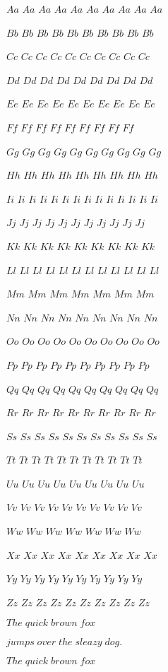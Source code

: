 \documentclass{worksheet}
\begin{document}
\begin{drillsheet}
\small

$Aa$ $Aa$ $Aa$ $Aa$ $Aa$ $Aa$ $Aa$ $Aa$ $Aa$ $Aa$

$Bb$ $Bb$ $Bb$ $Bb$ $Bb$ $Bb$ $Bb$ $Bb$ $Bb$ $Bb$

$Cc$ $Cc$ $Cc$ $Cc$ $Cc$ $Cc$ $Cc$ $Cc$ $Cc$ $Cc$

$Dd$ $Dd$ $Dd$ $Dd$ $Dd$ $Dd$ $Dd$ $Dd$ $Dd$

$Ee$ $Ee$ $Ee$ $Ee$ $Ee$ $Ee$ $Ee$ $Ee$ $Ee$ $Ee$

$Ff$ $Ff$ $Ff$ $Ff$ $Ff$ $Ff$ $Ff$ $Ff$ $Ff$

$Gg$ $Gg$ $Gg$ $Gg$ $Gg$ $Gg$ $Gg$ $Gg$ $Gg$ $Gg$

$Hh$ $Hh$ $Hh$ $Hh$ $Hh$ $Hh$ $Hh$ $Hh$ $Hh$

$Ii$ $Ii$ $Ii$ $Ii$ $Ii$ $Ii$ $Ii$ $Ii$ $Ii$ $Ii$ $Ii$ $Ii$ $Ii$ $Ii$

$Jj$ $Jj$ $Jj$ $Jj$ $Jj$ $Jj$ $Jj$ $Jj$ $Jj$ $Jj$ $Jj$

$Kk$ $Kk$ $Kk$ $Kk$ $Kk$ $Kk$ $Kk$ $Kk$ $Kk$

$Ll$ $Ll$ $Ll$ $Ll$ $Ll$ $Ll$ $Ll$ $Ll$ $Ll$ $Ll$ $Ll$ $Ll$

$Mm$ $Mm$ $Mm$ $Mm$ $Mm$ $Mm$ $Mm$

$Nn$ $Nn$ $Nn$ $Nn$ $Nn$ $Nn$ $Nn$ $Nn$ $Nn$

$Oo$ $Oo$ $Oo$ $Oo$ $Oo$ $Oo$ $Oo$ $Oo$ $Oo$ $Oo$

$Pp$ $Pp$ $Pp$ $Pp$ $Pp$ $Pp$ $Pp$ $Pp$ $Pp$ $Pp$

$Qq$ $Qq$ $Qq$ $Qq$ $Qq$ $Qq$ $Qq$ $Qq$ $Qq$ $Qq$

$Rr$ $Rr$ $Rr$ $Rr$ $Rr$ $Rr$ $Rr$ $Rr$ $Rr$ $Rr$

$Ss$ $Ss$ $Ss$ $Ss$ $Ss$ $Ss$ $Ss$ $Ss$ $Ss$ $Ss$ $Ss$

$Tt$ $Tt$ $Tt$ $Tt$ $Tt$ $Tt$ $Tt$ $Tt$ $Tt$ $Tt$ $Tt$

$Uu$ $Uu$ $Uu$ $Uu$ $Uu$ $Uu$ $Uu$ $Uu$ $Uu$

$Vv$ $Vv$ $Vv$ $Vv$ $Vv$ $Vv$ $Vv$ $Vv$ $Vv$ $Vv$

$Ww$ $Ww$ $Ww$ $Ww$ $Ww$ $Ww$ $Ww$

$Xx$ $Xx$ $Xx$ $Xx$ $Xx$ $Xx$ $Xx$ $Xx$ $Xx$

$Yy$ $Yy$ $Yy$ $Yy$ $Yy$ $Yy$ $Yy$ $Yy$ $Yy$ $Yy$

$Zz$ $Zz$ $Zz$ $Zz$ $Zz$ $Zz$ $Zz$ $Zz$ $Zz$ $Zz$

$The\;quick\;brown\;fox$

$jumps\;over\;the\;sleazy\;dog.$

$The\;quick\;brown\;fox$


\end{drillsheet}
\end{document}
